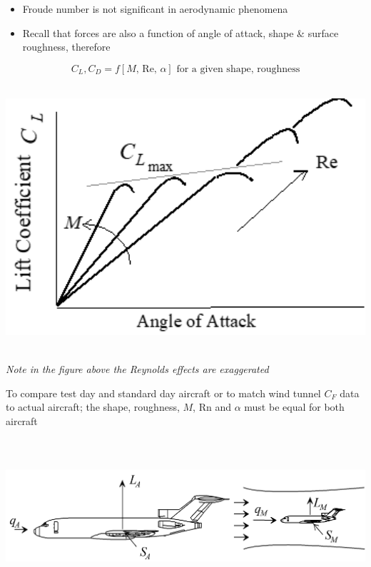 \documentclass[
]{book}
\providecommand{\tightlist}{%
  \setlength{\itemsep}{0pt}\setlength{\parskip}{0pt}}
\begin{document}
\begin{itemize}
\tightlist
\item
  Froude number is not significant in aerodynamic phenomena
\item
  Recall that forces are also a function of angle of attack, shape \& surface roughness, therefore
\end{itemize}

\[C_L,C_D = f \left[ M \text{, } \mathrm{Re} \text{, } \alpha \right] \text{ for a given shape, roughness} \]

\includegraphics[width=5.854in,height=3.863in]{media/05/image7.png}

\emph{Note in the figure above the Reynolds effects are exaggerated}

To compare test day and standard day aircraft or to match wind tunnel \(C_F\) data to actual aircraft; the shape, roughness, \(M\), \(\mathrm{Rn}\) and \(\alpha\) must be equal for both aircraft

\includegraphics[width=8.8in,height=2.25in]{media/05/image9.png}
\end{document}
